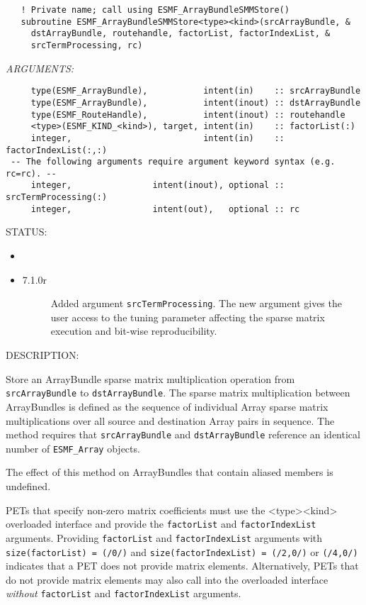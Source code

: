   
\begin{verbatim}   ! Private name; call using ESMF_ArrayBundleSMMStore()
   subroutine ESMF_ArrayBundleSMMStore<type><kind>(srcArrayBundle, &
     dstArrayBundle, routehandle, factorList, factorIndexList, &
     srcTermProcessing, rc)\end{verbatim}{\em ARGUMENTS:}
\begin{verbatim}     type(ESMF_ArrayBundle),           intent(in)    :: srcArrayBundle
     type(ESMF_ArrayBundle),           intent(inout) :: dstArrayBundle
     type(ESMF_RouteHandle),           intent(inout) :: routehandle
     <type>(ESMF_KIND_<kind>), target, intent(in)    :: factorList(:)
     integer,                          intent(in)    :: factorIndexList(:,:)
 -- The following arguments require argument keyword syntax (e.g. rc=rc). --
     integer,                intent(inout), optional :: srcTermProcessing(:)
     integer,                intent(out),   optional :: rc\end{verbatim}
{\sf STATUS:}
   \begin{itemize}
   \item{}
   \item{}
   \begin{description}
   \item[7.1.0r] Added argument {\tt srcTermProcessing}.
                The new argument gives the user access to the tuning parameter
                affecting the sparse matrix execution and bit-wise 
                reproducibility.
   \end{description}
   \end{itemize}
  
{\sf DESCRIPTION:\\ }


     Store an ArrayBundle sparse matrix multiplication operation from
     {\tt srcArrayBundle} to {\tt dstArrayBundle}. The sparse matrix
     multiplication between ArrayBundles is defined as the sequence of
     individual Array sparse matrix multiplications over all source and
     destination Array pairs in sequence. The method requires that
     {\tt srcArrayBundle} and {\tt dstArrayBundle} reference an identical
     number of {\tt ESMF\_Array} objects.
  
     The effect of this method on ArrayBundles that contain aliased members is
     undefined.
  
     PETs that specify non-zero matrix coefficients must use
     the <type><kind> overloaded interface and provide the {\tt factorList} and
     {\tt factorIndexList} arguments. Providing {\tt factorList} and
     {\tt factorIndexList} arguments with {\tt size(factorList) = (/0/)} and
     {\tt size(factorIndexList) = (/2,0/)} or {\tt (/4,0/)} indicates that a 
     PET does not provide matrix elements. Alternatively, PETs that do not 
     provide matrix elements may also call into the overloaded interface
     {\em without} {\tt factorList} and {\tt factorIndexList} arguments.
     
